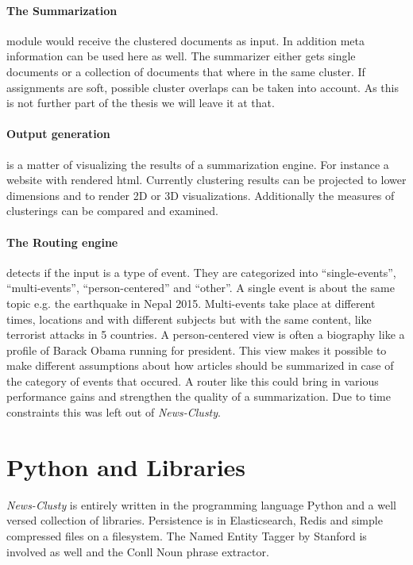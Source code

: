   \paragraph{The Summarization} module would receive the clustered documents as input. In addition meta information can be used here as well. The summarizer either gets single documents or a collection of documents that where in the same cluster. If assignments are soft, possible cluster overlaps can be taken into account. As this is not further part of the thesis we will leave it at that.

  \paragraph{Output generation} is a matter of visualizing the results of a summarization engine. For instance a website with rendered html. Currently clustering results can be projected to lower dimensions and to render 2D or 3D visualizations. Additionally the measures of clusterings can be compared and examined.

  \paragraph{The Routing engine} detects if the input is a type of event. They are categorized into ``single-events'', ``multi-events'', ``person-centered'' and ``other''. A single event is about the same topic e.g. the earthquake in Nepal 2015. Multi-events take place at different times, locations and with different subjects but with the same content, like terrorist attacks in 5 countries. A person-centered view is often a biography like a profile of Barack Obama running for president. This view makes it possible to make different assumptions about how articles should be summarized in case of the category of events that occured. A router like this could bring in various performance gains and strengthen the quality of a summarization. Due to time constraints this was left out of \emph{News-Clusty}.

\section{Python and Libraries}
  \emph{News-Clusty} is entirely written in the programming language Python and a well versed collection of libraries. Persistence is in Elasticsearch, Redis and simple compressed files on a filesystem. The Named Entity Tagger by Stanford is involved as well and the Conll Noun phrase extractor. 

